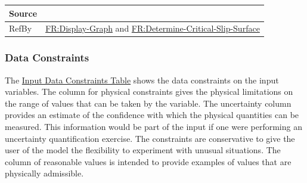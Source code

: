 \documentclass[12pt]{article}
\begin{document}
\begin{minipage}{\textwidth}
\begin{tabular}{>{\raggedright}p{}>{\raggedright\arraybackslash}p{}}
\\ \midrule
Source & \cite{li2010}
         
\\ \midrule
RefBy & \hyperref[displayGraph]{FR:Display-Graph} and \hyperref[determineCritSlip]{FR:Determine-Critical-Slip-Surface}
        
\\ \bottomrule
\end{tabular}
\end{minipage}

\subsubsection{Data Constraints}
\label{Sec:DataConstraints}
The \hyperref[Table:InDataConstraints]{Input Data Constraints Table} shows the data constraints on the input variables. The column for physical constraints gives the physical limitations on the range of values that can be taken by the variable. The uncertainty column provides an estimate of the confidence with which the physical quantities can be measured. This information would be part of the input if one were performing an uncertainty quantification exercise. The constraints are conservative to give the user of the model the flexibility to experiment with unusual situations. The column of reasonable values is intended to provide examples of values that are physically admissible.
\end{document}

